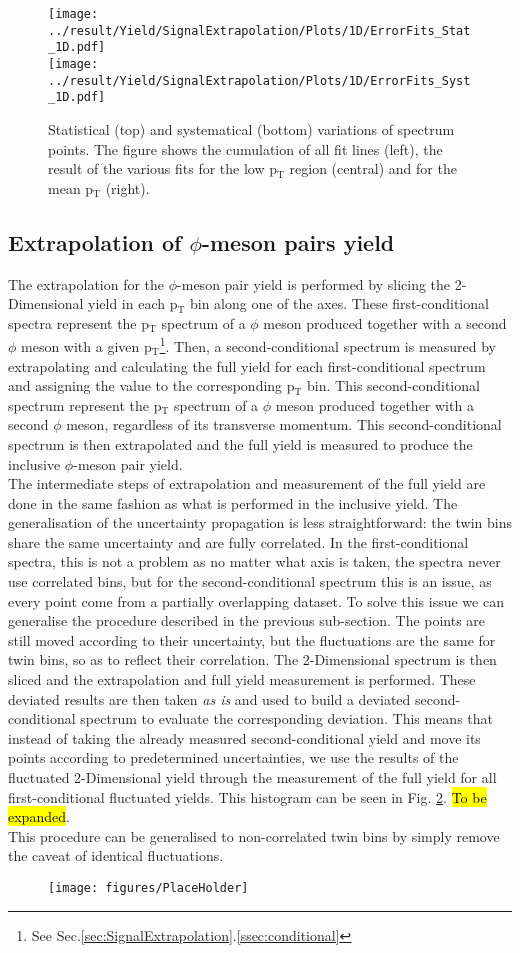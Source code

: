 \begin{figure}[!h]
\centering
\texttt{[image: ../result/Yield/SignalExtrapolation/Plots/1D/ErrorFits\_Stat\_1D.pdf]}\\
\texttt{[image: ../result/Yield/SignalExtrapolation/Plots/1D/ErrorFits\_Syst\_1D.pdf]}
\caption{Statistical (top) and systematical (bottom) variations of spectrum points. The figure shows the cumulation of all fit lines (left), the result of the various fits for the low p$_{\text{T}}$ region (central) and for the mean p$_{\text{T}}$ (right).}
\label{fig:Extrap1D}
\end{figure}

\subsection{Extrapolation of $\phi$-meson pairs yield}
The extrapolation for the $\phi$-meson pair yield is performed by slicing the 2-Dimensional yield in each p$_{\text{T}}$ bin along one of the axes. These first-conditional spectra represent the p$_{\text{T}}$ spectrum of a $\phi$ meson produced together with a second $\phi$ meson with a given p$_{\text{T}}$\footnote{See Sec.\ref{sec:SignalExtrapolation}.\ref{ssec:conditional}}. Then, a second-conditional spectrum is measured by extrapolating and calculating the full yield for each first-conditional spectrum and assigning the value to the corresponding p$_{\text{T}}$ bin. This second-conditional spectrum represent the p$_{\text{T}}$ spectrum of a $\phi$ meson produced together with a second $\phi$ meson, regardless of its transverse momentum. This second-conditional spectrum is then extrapolated and the full yield is measured to produce the inclusive $\phi$-meson pair yield.\\
\indent The intermediate steps of extrapolation and measurement of the full yield are done in the same fashion as what is performed in the inclusive yield. The generalisation of the uncertainty propagation is less straightforward: the twin bins share the same uncertainty and are fully correlated. In the first-conditional spectra, this is not a problem as no matter what axis is taken, the spectra never use correlated bins, but for the second-conditional spectrum this is an issue, as every point come from a partially overlapping dataset. To solve this issue we can generalise the procedure described in the previous sub-section. The points are still moved according to their uncertainty, but the fluctuations are the same for twin bins, so as to reflect their correlation. The 2-Dimensional spectrum is then sliced and the extrapolation and full yield measurement is performed. These deviated results are then taken \textit{as is} and used to build a deviated second-conditional spectrum to evaluate the corresponding deviation. This means that instead of taking the already measured second-conditional yield and move its points according to predetermined uncertainties, we use the results of the fluctuated 2-Dimensional yield through the measurement of the full yield for all first-conditional fluctuated yields. This histogram can be seen in Fig. \ref{fig:Extrap2D}. \hl{To be expanded}.\\
\indent This procedure can be generalised to non-correlated twin bins by simply remove the caveat of identical fluctuations.

\begin{figure}
\centering
\texttt{[image: figures/PlaceHolder]}
\label{fig:Extrap2D}
\caption{}
\end{figure}